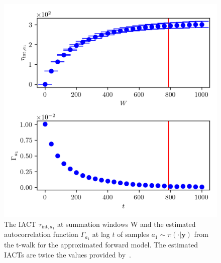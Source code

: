 \begin{figure}[ht!]
	\centering
	\includegraphics{UwerrTauIntTWalk7.png}
	\caption[IACT and autocorrelation function of samples $a_1 \sim \pi(\cdot|\bm{y})$, for approximated model.]{The IACT $\tau_{\text{int},a_1}$ at summation windows W and the estimated autocorrelation function $\Gamma_{a_1}$ at lag $t$ of samples $a_1 \sim \pi( \cdot| \bm{y})$ from the t-walk for the approximated forward model.
	The estimated IACTs are twice the values provided by~\cite{drikHesse, UwerrM}.}
	\label{fig:TWalkIATC8}
\end{figure}


